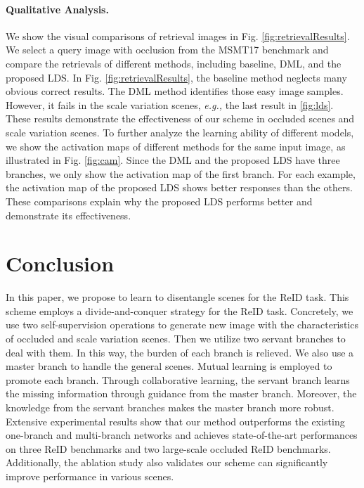 \documentclass[a4paper]{cas-dc}
\begin{document}
\paragraph{Qualitative Analysis.}
We show the visual comparisons of retrieval images in Fig. \ref{fig:retrievalResults}. We select a query image with occlusion from the MSMT17 benchmark and compare the retrievals of different methods, including baseline, DML, and the proposed LDS. In Fig. \ref{fig:retrievalResults}, the baseline method neglects many obvious correct results. The DML method identifies those easy image samples. However, it fails in the scale variation scenes, \textit{e.g.,} the last result in \ref{fig:lds}. These results demonstrate the effectiveness of our scheme in occluded scenes and scale variation scenes. To further analyze the learning ability of different models, we show the activation maps of different methods for the same input image, as illustrated in Fig. \ref{fig:cam}. Since the DML and the proposed LDS have three branches, we only show the activation map of the first branch. For each example, the activation map of the proposed LDS shows better responses than the others. These comparisons explain why the proposed LDS performs better and demonstrate its effectiveness.

\section{Conclusion} \label{conlusion}
In this paper, we propose to learn to disentangle scenes for the ReID task. This scheme employs a divide-and-conquer strategy for the ReID task. Concretely, we use two self-supervision operations to generate new image with the characteristics of occluded and scale variation scenes. Then we utilize two servant branches to deal with them. In this way, the burden of each branch is relieved. We also use a master branch to handle the general scenes. Mutual learning is employed to promote each branch. Through collaborative learning, the servant branch learns the missing information through guidance from the master branch. Moreover, the knowledge from the servant branches makes the master branch more robust. Extensive experimental results show that our method outperforms the existing one-branch and multi-branch networks and achieves state-of-the-art performances on three ReID benchmarks and two large-scale occluded ReID benchmarks. Additionally, the ablation study also validates our scheme can significantly improve performance in various scenes.








\end{document}
